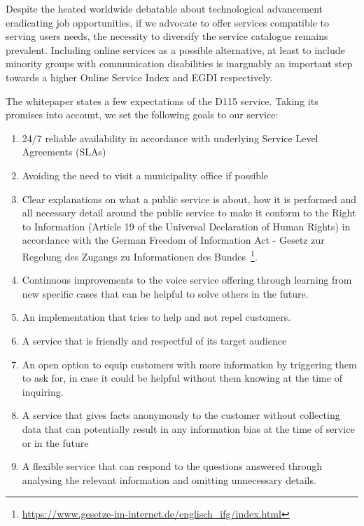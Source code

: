 Despite the heated worldwide debatable about technological advancement eradicating job opportunities, if we advocate to offer services compatible to serving users needs, the necessity to diversify the service catalogue remains prevalent. Including online services as a possible alternative, at least to include minority groups with communication disabilities is inarguably an important step towards a higher Online Service Index and EGDI respectively.

The whitepaper states a few expectations of the D115 service. Taking its promises into account, we set the following goals to our service:
\begin{enumerate}
\item 24/7 reliable availability in accordance with underlying Service Level Agreements (SLAs)

\item Avoiding the need to visit a municipality office if possible

\item Clear explanations on what a public service is about, how it is performed and all necessary detail around the public service to make it conform to the Right to Information (Article 19 of the Universal Declaration of Human Rights) in accordance with the German Freedom of Information Act - Gesetz zur Regelung des Zugangs zu Informationen des Bundes~\footnote{\url{ https://www.gesetze-im-internet.de/englisch_ifg/index.html}}.

\item Continuous improvements to the voice service offering through learning from new specific cases that can be helpful to solve others in the future.

\item An implementation that tries to help and not repel customers.

\item A service that is friendly and respectful of its target audience

\item An open option to equip customers with more information by triggering them to ask for, in case it could be helpful without them knowing at the time of inquiring. %

\item A service that gives facts anonymously to the customer without collecting data that can potentially result in any information bias at the time of service or in the future

\item A flexible service that can respond to the questions answered through analysing the relevant information and omitting unnecessary details.



\end{enumerate}






